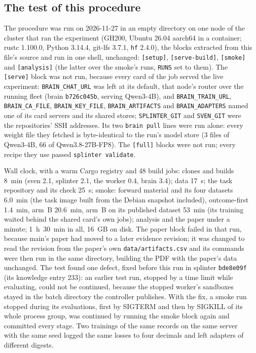 \subsection{The test of this procedure}\label{app:repro-vim-test}

\begin{sloppypar}
The procedure was run on 2026-11-27 in an empty directory on one node of the cluster that ran the experiment (GH200, Ubuntu
26.04 aarch64 in a container; rustc 1.100.0, Python 3.14.4, git-lfs 3.7.1, \texttt{hf} 2.4.0), the blocks extracted from
this file's source and run in one shell, unchanged: \texttt{[setup]}, \texttt{[serve-build]}, \texttt{[smoke]} and
\texttt{[analysis]} (the latter over the smoke's runs, \texttt{RUNS} set to them). The \texttt{[serve]} block was not run,
because every card of the job served the live experiment: \texttt{BRAIN\_CHAT\_URL} was left at its default, that node's
router over the running fleet (brain \texttt{b726c045b}, serving Qwen3-4B), and \texttt{BRAIN\_TRAIN\_URL},
\texttt{BRAIN\_CA\_FILE}, \texttt{BRAIN\_KEY\_FILE}, \texttt{BRAIN\_ARTIFACTS} and \texttt{BRAIN\_ADAPTERS} named one of its
card servers and its shared stores; \texttt{SPLINTER\_GIT} and \texttt{SVEN\_GIT} were the repositories' SSH addresses. Its
two \texttt{brain pull} lines were run alone: every weight file they fetched is byte-identical to the run's model store (3
files of Qwen3-4B, 66 of Qwen3.8-27B-FP8). The \texttt{[full]} blocks were not run; every recipe they use passed
\texttt{splinter validate}.
\end{sloppypar}

\begin{sloppypar}
Wall clock, with a warm Cargo registry and 48 build jobs: clones and builds 8~min (sven 2.1, splinter 2.1, the worker 0.4,
brain 3.4); data 17~s; the task repository and its check 25~s; smoke: forward material and its four datasets 6.0~min
(the task image built from the Debian snapshot included), outcome-first 1.4~min, arm~B 20.6~min, arm~B on its published
dataset 53~min (its training waited behind the shared card's own jobs); analysis and the paper under a minute; 1~h~30~min in
all, 16~GB on disk. The paper block failed in that run, because main's paper had moved to a later evidence revision; it
was changed to read the revision from the paper's own \texttt{data/artifacts.csv} and its commands were then run in the same
directory, building the PDF with the paper's data unchanged. The test found one defect, fixed before this run in splinter \texttt{bde8e09f} (its knowledge entry 233):
an earlier test run, stopped by a time limit while evaluating, could not be continued, because the stopped worker's sandboxes
stayed in the batch directory the controller publishes. With the fix, a smoke run stopped during its evaluations, first by
SIGTERM and then by SIGKILL of its whole process group, was continued by running the smoke block again and committed every
stage. Two trainings of the same records on the same server with the same seed logged the same losses to four decimals and
left adapters of different digests.
\end{sloppypar}
